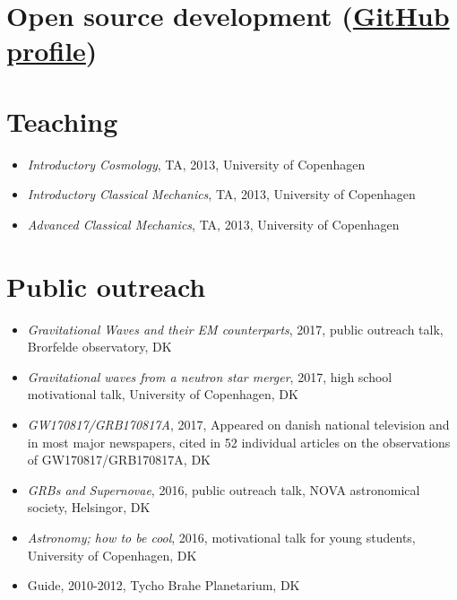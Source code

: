 \documentclass[12pt,letterpaper]{article}
\begin{document}
\section*{Open source development (\href{https://github.com/jselsing}{GitHub profile})}


\section*{Teaching}

\begin{itemize}
	
	\item \emph{Introductory Cosmology}, TA, 2013, University of Copenhagen
    \item \emph{Introductory Classical Mechanics}, TA, 2013, University of Copenhagen
	\item \emph{Advanced Classical Mechanics}, TA, 2013, University of Copenhagen
\end{itemize}


\section*{Public outreach}

\begin{itemize}
    \item \emph{Gravitational Waves and their EM counterparts}, 2017, public outreach talk, Brorfelde observatory, DK
    \item \emph{Gravitational waves from a neutron star merger}, 2017, high school motivational talk, University of Copenhagen, DK
    \item \emph{GW170817/GRB170817A}, 2017, Appeared on danish national television and in most major newspapers, cited in 52 individual articles on the observations of GW170817/GRB170817A, DK    
    \item \emph{GRBs and Supernovae}, 2016, public outreach talk, NOVA astronomical society, Helsingor, DK
    \item \emph{Astronomy; how to be cool}, 2016, motivational talk for young students, University of Copenhagen, DK
    
    \item Guide, 2010-2012, Tycho Brahe Planetarium, DK

\end{itemize}
\end{document}
